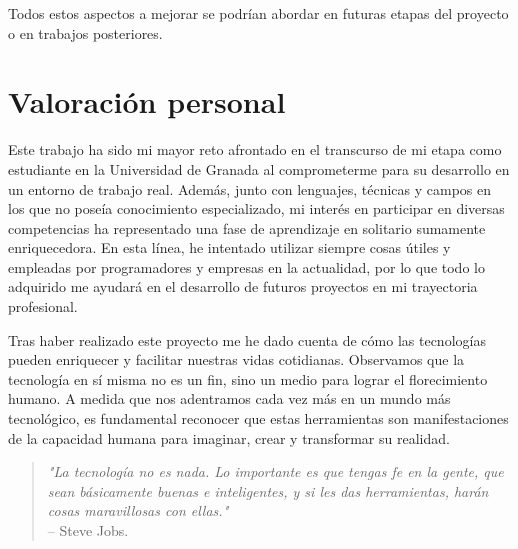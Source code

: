  Todos estos aspectos a mejorar se podrían abordar en futuras etapas del proyecto o en trabajos posteriores.

 \section{Valoración personal}

 Este trabajo ha sido mi mayor reto afrontado en el transcurso de mi etapa como estudiante en la Universidad de Granada al comprometerme para su desarrollo en un entorno de trabajo real. Además, junto con lenguajes, técnicas y campos en los que no poseía conocimiento especializado, mi interés en participar en diversas competencias ha representado una fase de aprendizaje en solitario sumamente enriquecedora. En esta línea, he intentado utilizar siempre cosas útiles y empleadas por programadores y empresas en la actualidad, por lo que todo lo adquirido me ayudará en el desarrollo de futuros proyectos en mi trayectoria profesional.

 Tras haber realizado este proyecto me he dado cuenta de cómo las tecnologías pueden enriquecer y facilitar nuestras vidas cotidianas. Observamos que la tecnología en sí misma no es un fin, sino un medio para lograr el florecimiento humano. A medida que nos adentramos cada vez más en un mundo más tecnológico, es fundamental reconocer que estas herramientas son manifestaciones de la capacidad humana para imaginar, crear y transformar su realidad. 

\begin{quote}
    \textit{"La tecnología no es nada. Lo importante es que tengas fe en la gente, que sean básicamente buenas e inteligentes, y si les das herramientas, harán cosas maravillosas con ellas."} \\ 
    -- Steve Jobs.
\end{quote}
